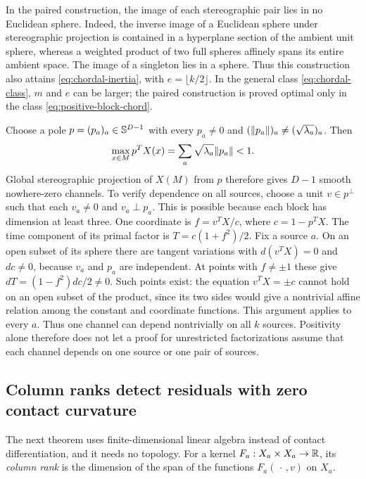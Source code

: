 In the paired construction, the image of each stereographic pair lies
in no Euclidean sphere. Indeed, the inverse image of a Euclidean sphere under
stereographic projection is contained in a hyperplane section of the
ambient unit sphere, whereas a weighted product of two full spheres
affinely spans its entire ambient space. The image of a singleton lies in a sphere. Thus this construction also
attains \eqref{eq:chordal-inertia}, with $e=\lfloor k/2\rfloor$.
In the general class \eqref{eq:chordal-class}, $m$ and $e$ can be
larger; the paired construction is proved optimal only in the class
\eqref{eq:positive-block-chord}.

\begin{example}\label{ex:all-block-channel}
Choose a pole $p=(p_a)_a\in\mathbb S^{D-1}$ with every $p_a\ne0$ and
$(\lVert p_a\rVert)_a\ne(\sqrt{\lambda_a})_a$. Then
\[
 \max_{x\in M}p^TX(x)=\sum_a\sqrt{\lambda_a}\lVert p_a\rVert<1.
\]
Global stereographic projection of $X(M)$ from $p$ therefore gives
$D-1$ smooth nowhere-zero channels. To verify dependence on all sources,
choose a unit $v\in p^\perp$ such that each $v_a\ne0$ and
$v_a\perp p_a$. This is possible because each block has dimension at
least three. One coordinate is $f=v^TX/c$, where $c=1-p^TX$.
The time component of its primal factor is
$T=c(1+f^2)/2$. Fix a source $a$. On an open subset of its sphere there
are tangent variations with $d(v^TX)=0$ and $dc\ne0$, because $v_a$ and
$p_a$ are independent. At points with $f\ne\pm1$ these give
$dT=(1-f^2)dc/2\ne0$. Such points exist: the equation $v^TX=\pm c$
cannot hold on an open subset of the product, since its two sides would
give a nontrivial affine relation among the constant and coordinate
functions. This argument applies to every $a$. Thus one channel can
depend nontrivially on all $k$ sources. Positivity alone therefore
does not let a proof for unrestricted factorizations assume that each
channel depends on one source or one pair of sources.
\end{example}

\subsection{Column ranks detect residuals with zero contact curvature}
The next theorem uses finite-dimensional linear algebra instead of
contact differentiation, and it needs no topology. For a kernel
$F_a:X_a\times X_a\to\mathbb R$, its \emph{column rank} is the dimension of the
span of the functions $F_a(\,\cdot\,,v)$ on $X_a$.

